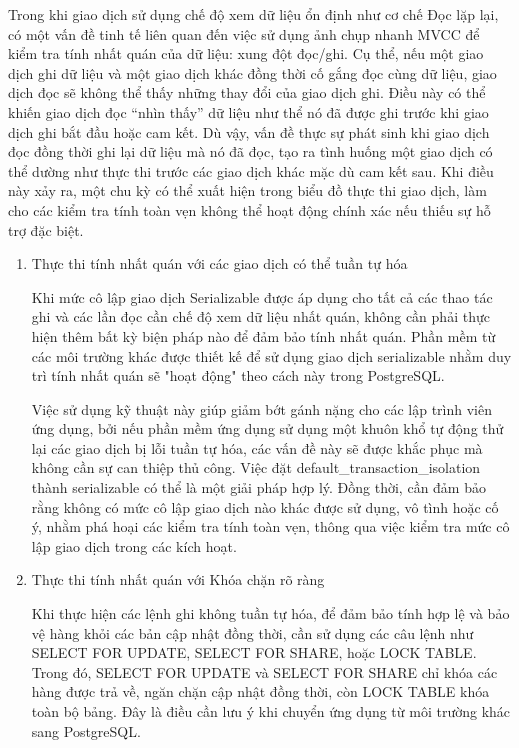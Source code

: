 Trong khi giao dịch sử dụng chế độ xem dữ liệu ổn định như cơ chế Đọc lặp lại, có một vấn đề tinh tế liên quan đến việc sử dụng ảnh chụp nhanh MVCC để kiểm tra tính nhất quán của dữ liệu: xung đột đọc/ghi. Cụ thể, nếu một giao dịch ghi dữ liệu và một giao dịch khác đồng thời cố gắng đọc cùng dữ liệu, giao dịch đọc sẽ không thể thấy những thay đổi của giao dịch ghi. Điều này có thể khiến giao dịch đọc “nhìn thấy” dữ liệu như thể nó đã được ghi trước khi giao dịch ghi bắt đầu hoặc cam kết. Dù vậy, vấn đề thực sự phát sinh khi giao dịch đọc đồng thời ghi lại dữ liệu mà nó đã đọc, tạo ra tình huống một giao dịch có thể dường như thực thi trước các giao dịch khác mặc dù cam kết sau. Khi điều này xảy ra, một chu kỳ có thể xuất hiện trong biểu đồ thực thi giao dịch, làm cho các kiểm tra tính toàn vẹn không thể hoạt động chính xác nếu thiếu sự hỗ trợ đặc biệt.
\begin{enumerate}
    \item Thực thi tính nhất quán với các giao dịch có thể tuần tự hóa

    \hspace{1cm}Khi mức cô lập giao dịch Serializable được áp dụng cho tất cả các thao tác ghi và các lần đọc cần chế độ xem dữ liệu nhất quán, không cần phải thực hiện thêm bất kỳ biện pháp nào để đảm bảo tính nhất quán. Phần mềm từ các môi trường khác được thiết kế để sử dụng giao dịch serializable nhằm duy trì tính nhất quán sẽ "hoạt động" theo cách này trong PostgreSQL.
    
    \hspace{1cm}Việc sử dụng kỹ thuật này giúp giảm bớt gánh nặng cho các lập trình viên ứng dụng, bởi nếu phần mềm ứng dụng sử dụng một khuôn khổ tự động thử lại các giao dịch bị lỗi tuần tự hóa, các vấn đề này sẽ được khắc phục mà không cần sự can thiệp thủ công. Việc đặt default\_transaction\_isolation thành serializable có thể là một giải pháp hợp lý. Đồng thời, cần đảm bảo rằng không có mức cô lập giao dịch nào khác được sử dụng, vô tình hoặc cố ý, nhằm phá hoại các kiểm tra tính toàn vẹn, thông qua việc kiểm tra mức cô lập giao dịch trong các kích hoạt.
    \item Thực thi tính nhất quán với Khóa chặn rõ ràng

    \hspace{1cm}Khi thực hiện các lệnh ghi không tuần tự hóa, để đảm bảo tính hợp lệ và bảo vệ hàng khỏi các bản cập nhật đồng thời, cần sử dụng các câu lệnh như SELECT FOR UPDATE, SELECT FOR SHARE, hoặc LOCK TABLE. Trong đó, SELECT FOR UPDATE và SELECT FOR SHARE chỉ khóa các hàng được trả về, ngăn chặn cập nhật đồng thời, còn LOCK TABLE khóa toàn bộ bảng. Đây là điều cần lưu ý khi chuyển ứng dụng từ môi trường khác sang PostgreSQL.


\end{enumerate}
